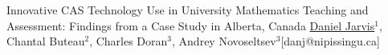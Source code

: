 \begin{abstract_online}{Innovative CAS Technology Use in University Mathematics
Teaching and Assessment: Findings from a Case Study in Alberta, Canada}{%
        \underline{Daniel Jarvis}$^{1}$, Chantal Buteau$^{2}$,
        Charles Doran$^{3}$, Andrey Novoseltsev$^{3}$}{[danj@nipissingu.ca]
        }
\end{abstract_online}
